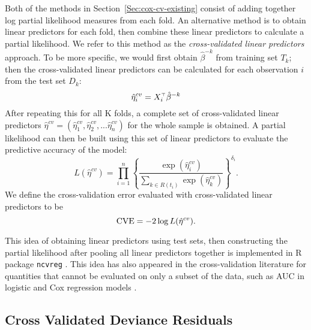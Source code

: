\par Both of the methods in Section~\ref{Sec:cox-cv-existing} consist of adding together log partial likelihood measures from each fold.  An alternative method is to obtain linear predictors for each fold, then combine these linear predictors to calculate a partial likelihood. We refer to this method as the \emph{cross-validated linear predictors} approach. To be more specific, we would first obtain $\hat{\beta}^{-k}$ from training set $T_{k}$; then the cross-validated linear predictors can be calculated for each observation $i$ from the test set $D_k$:  
\begin{equation}
  \label{eq:cv-lp}
  \hat{\eta}^{cv}_{i} = X_{i}^{\scriptscriptstyle\top}\hat{\beta}^{-k}
\end{equation} 
After repeating this for all K folds, a complete set of cross-validated linear predictors $\hat{\eta}^{cv} = ( \hat{\eta}^{cv}_{1},  \hat{\eta}^{cv}_{2} , ...  \hat{\eta}^{cv}_{n})$ for the whole sample is obtained. A partial likelihood can then be built using this set of linear predictors to evaluate the predictive accuracy of the model:
\begin{equation*}
  L(\hat{\eta}^{cv}) = \prod_{i=1}^{n} \left\{ \frac{\exp (\hat{\eta}^{cv}_{i})}{\sum_{k \in R(t_{i})}\exp (\hat{\eta}^{cv}_k)} \right\} ^{\delta_i}.
\end{equation*}
We define the cross-validation error evaluated with cross-validated linear predictors to be $$\textrm{CVE} = - 2 \log L(\hat{\eta}^{cv}).$$
  
\par This idea of obtaining linear predictors using test sets, then constructing the partial likelihood after pooling all linear predictors together is implemented in R package \texttt{ncvreg} \citep{ncvreg}. This idea has also appeared in the cross-validation literature for quantities that cannot be evaluated on only a subset of the data, such as AUC in logistic and Cox regression models \citep{Parker2007,Simon2011a,Subramanian2011}.

\subsection{Cross Validated Deviance Residuals}

